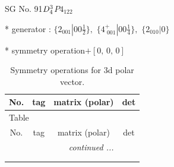 \documentclass[fleqn,8pt]{jsarticle}
\begin{document}
\setcounter{MaxMatrixCols}{32}

\renewcommand{\tablename}{Table~}
\renewcommand{\figurename}{Figure~}
\begin{center}
\LARGE
SG No. 91\quad$D_{\rm 4}^{3}$\quad$P4_122$\quad[ tetragonal ]
\end{center}

* generator : $\{2{}_{001}|0 0 \frac{1}{2}\},\,\,\{4^{+}_{\,\,001}|0 0 \frac{1}{4}\},\,\,\{2{}_{010}|0\}$

* symmetry operation\quad$+\left[ 0,\, 0,\, 0 \right]$
\renewcommand{\arraystretch}{1.3}
\begin{longtable}{cccc}
\caption{Symmetry operations for 3d polar vector.}
 \\
 \hline \hline
No. & tag & matrix (polar) & det \\ \hline \endfirsthead

\multicolumn{3}{l}{\tablename\ \thetable{}} \\
 \hline \hline
No. & tag & matrix (polar) & det \\ \hline \endhead

 \hline \hline
\multicolumn{3}{r}{\footnotesize\it continued ...} \\ \endfoot

 \hline \hline
\multicolumn{3}{r}{} \\ \endlastfoot


\end{longtable}
\end{document}
